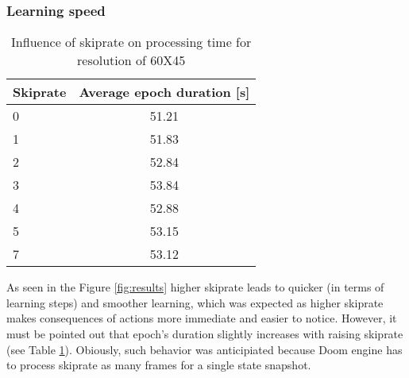 		\subsubsection{Learning speed} 
			\begin{table}
				\begin{center}
					\begin{tabular}{ |l | c |}
						\hline
						Skiprate & Average epoch duration [s] \\ \hline
						0 & 51.21 \\ \hline
						1 & 51.83 \\ \hline
						2 & 52.84 \\ \hline
						3 & 53.84 \\ \hline
						4 & 52.88 \\ \hline
						5 & 53.15 \\ \hline
						7 & 53.12 \\ \hline
					\end{tabular}
				\end{center}
				\caption{Influence of skiprate on processing time for resolution of 60X45}\label{tab:time_results}
			\end{table}
			As seen in the Figure \ref{fig:results} higher skiprate leads to quicker (in terms of learning steps) and smoother learning, which was expected as higher skiprate makes consequences of actions more immediate and easier to notice. However, it must be pointed out that epoch's duration slightly increases with raising skiprate (see Table \ref{tab:time_results}). Obiously, such behavior was anticipiated because Doom engine has to process skiprate as many frames for a single state snapshot.

